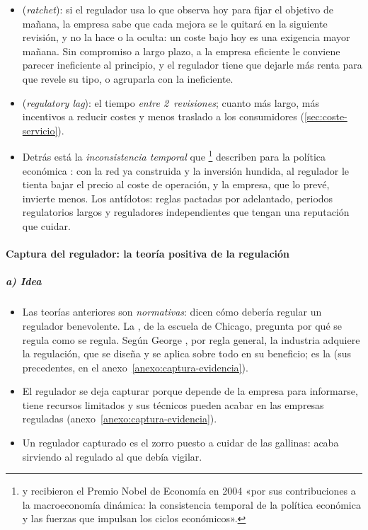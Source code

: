 \documentclass[11pt]{article}
\begin{document}
\begin{itemize}
\item {} (\emph{ratchet}): si el regulador usa lo que observa hoy para fijar el objetivo de mañana, la empresa sabe que cada mejora se le quitará en la siguiente revisión, y no la hace o la oculta: un coste bajo hoy es una exigencia mayor mañana\nocite{Weitzman1980Ratchet}. Sin compromiso a largo plazo, a la empresa eficiente le conviene parecer ineficiente al principio, y el regulador tiene que dejarle más renta para que revele su tipo, o agruparla con la ineficiente\nocite{FreixasGuesnerieTirole1985Planning,LaffontTirole1988Dynamics}.
\item {} (\emph{regulatory lag}): el tiempo \emph{entre 2~revisiones}; cuanto más largo, más incentivos a reducir costes y menos traslado a los consumidores (\ref{sec:coste-servicio}).
\item Detrás está la \emph{inconsistencia temporal} que \textcite{KydlandPrescott1977Rules}\footnote{ y  recibieron el Premio Nobel de Economía en 2004 «por sus contribuciones a la macroeconomía dinámica: la consistencia temporal de la política económica y las fuerzas que impulsan los ciclos económicos»\nocite{Nobel2004KydlandPrescott}.} describen para la política económica  : con la red ya construida y la inversión hundida, al regulador le tienta bajar el precio al coste de operación, y la empresa, que lo prevé, invierte menos. Los antídotos: reglas pactadas por adelantado, periodos regulatorios largos y reguladores independientes que tengan una reputación que cuidar.
\end{itemize}

\paragraph{Captura del regulador: la teoría positiva de la regulación}

\subparagraph{a) Idea}

\begin{itemize}
\item Las teorías anteriores son \emph{normativas}: dicen cómo debería regular un regulador benevolente. La , de la escuela de Chicago, pregunta por qué se regula como se regula\nocite{DenHertog2000General,DenHertog2010Review}. Según George \textcite{Stigler1971Theory}, por regla general, la industria adquiere la regulación, que se diseña y se aplica sobre todo en su beneficio; es la  (sus precedentes, en el anexo~\ref{anexo:captura-evidencia}).
\item El regulador se deja capturar porque depende de la empresa para informarse, tiene recursos limitados y sus técnicos pueden acabar en las empresas reguladas (anexo~\ref{anexo:captura-evidencia}).
\item Un regulador capturado es el zorro puesto a cuidar de las gallinas: acaba sirviendo al regulado al que debía vigilar.
\end{itemize}
\end{document}
